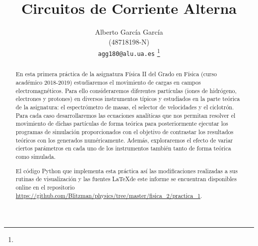 \documentclass[journal]{IEEEtran}
\begin{document}
%
\title{Circuitos de Corriente Alterna}
%
%
%

\author{Alberto García García\\ (48718198-N)\\ \texttt{agg180@alu.ua.es} %
\thanks{}%
}


%
{}
% 


\maketitle

\begin{abstract}
En esta primera práctica de la asignatura Física II del Grado en Física (curso académico 2018-2019) estudiaremos el movimiento de cargas en campos electromagnéticos. Para ello consideraremos diferentes partículas (iones de hidrógeno, electrones y protones) en diversos instrumentos típicos y estudiados en la parte teórica de la asignatura: el espectrómetro de masas, el selector de velocidades y el ciclotrón. Para cada caso desarrollaremos las ecuaciones analíticas que nos permitan resolver el movimiento de dichas partículas de forma teórica para posteriormente ejecutar los programas de simulación proporcionados con el objetivo de contrastar los resultados teóricos con los generados numéricamente. Además, exploraremos el efecto de variar ciertos parámetros en cada uno de los instrumentos también tanto de forma teórica como simulada.

El código Python que implementa esta práctica así las modificaciones realizadas a sus rutinas de visualización y las fuentes \LaTeX de este informe se encuentran disponibles online en el repositorio \url{https://github.com/Blitzman/physics/tree/master/fisica_2/practica_1}.
\end{abstract}
\end{document}
